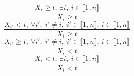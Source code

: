 $$\frac{X_{i} \geq t,~\exists i,~i \in \llbracket1,n\rrbracket}{X_{i} \geq t}$$ $$\frac{X_{i'}<t,~\forall i',~i' \neq i,~i' \in \llbracket1,n\rrbracket,~i \in \llbracket1,n\rrbracket}{X_{i} \geq t}$$ $$\frac{X_{i'} \geq t,~\forall i',~i' \neq i,~i' \in \llbracket1,n\rrbracket,~i \in \llbracket1,n\rrbracket}{X_{i}<t}$$ $$\frac{X_{i}<t,~\exists i,~i \in \llbracket1,n\rrbracket}{X_{i}<t}$$ 